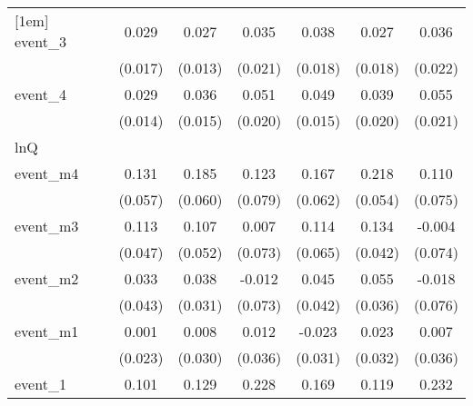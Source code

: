{\begin{tabular}{l*{6}{c}}
[1em]
event\_3     &       0.029         &       0.027\sym{*}  &       0.035         &       0.038\sym{*}  &       0.027         &       0.036         \\
            &     (0.017)         &     (0.013)         &     (0.021)         &     (0.018)         &     (0.018)         &     (0.022)         \\
[1em]
event\_4     &       0.029\sym{*}  &       0.036\sym{*}  &       0.051\sym{*}  &       0.049\sym{***}&       0.039         &       0.055\sym{**} \\
            &     (0.014)         &     (0.015)         &     (0.020)         &     (0.015)         &     (0.020)         &     (0.021)         \\
\hline
lnQ         &                     &                     &                     &                     &                     &                     \\
event\_m4    &       0.131\sym{*}  &       0.185\sym{**} &       0.123         &       0.167\sym{**} &       0.218\sym{***}&       0.110         \\
            &     (0.057)         &     (0.060)         &     (0.079)         &     (0.062)         &     (0.054)         &     (0.075)         \\
[1em]
event\_m3    &       0.113\sym{*}  &       0.107\sym{*}  &       0.007         &       0.114         &       0.134\sym{**} &      -0.004         \\
            &     (0.047)         &     (0.052)         &     (0.073)         &     (0.065)         &     (0.042)         &     (0.074)         \\
[1em]
event\_m2    &       0.033         &       0.038         &      -0.012         &       0.045         &       0.055         &      -0.018         \\
            &     (0.043)         &     (0.031)         &     (0.073)         &     (0.042)         &     (0.036)         &     (0.076)         \\
[1em]
event\_m1    &       0.001         &       0.008         &       0.012         &      -0.023         &       0.023         &       0.007         \\
            &     (0.023)         &     (0.030)         &     (0.036)         &     (0.031)         &     (0.032)         &     (0.036)         \\
[1em]
event\_1     &       0.101\sym{***}&       0.129\sym{**} &       0.228\sym{***}&       0.169\sym{***}&       0.119\sym{**} &       0.232\sym{***}\\

\end{tabular}}

